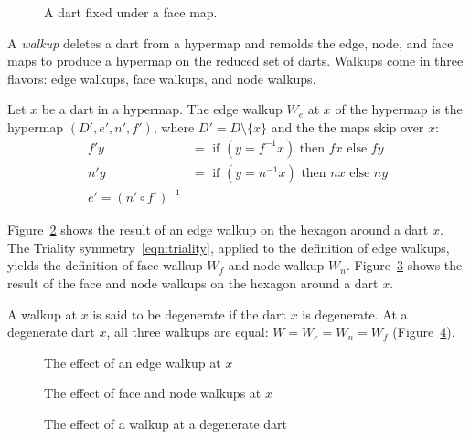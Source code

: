 \begin{figure}[htb]
  \centering
  \caption{A dart fixed under a face map.}
  \label{fig:dart-fix}
\end{figure}


A {\it walkup} deletes
a dart from a hypermap and remolds the edge, node, and face
maps to produce a hypermap on the reduced set of darts.  Walkups
come in three flavors: edge walkups, face walkups,
and node walkups.

\begin{definition}[walkup]
Let $x$ be a dart in a hypermap.  The edge walkup 
$W_e$ at $x$ of the hypermap is the hypermap
$(D',e',n',f')$, where $D' = D\setminus\{x\}$ and the
the maps skip over $x$:
    $$
    \begin{array}{lll}
    f' y &= \text{ if } (y = f^{-1} x) \text{ then } f x \text{ else
    } f y\\
    n' y &= \text{ if } (y = n^{-1} x) \text{ then } n x \text{ else
    } n y\\
    e' = (n'\circ f')^{-1}
    \end{array}
    $$
\end{definition}

Figure~\ref{fig:walk} shows
the result of an edge walkup on the hexagon around a dart $x$.
The Triality symmetry~\ref{eqn:triality}, applied to the definition
of edge walkups, yields the definition of
face walkup $W_f$ and node walkup $W_n$.  
Figure~\ref{fig:walkfn} shows the result of the face and node
walkups on the hexagon around a dart $x$.

A walkup at $x$ is said to be degenerate 
if the dart $x$ is degenerate.   
At a degenerate dart $x$, all three walkups
are equal: $W=W_e=W_n=W_f$ (Figure~\ref{fig:walkdeg}).

\begin{figure}[htb]
  \centering
  \caption{The effect of an edge walkup at $x$}
  \label{fig:walk}
\end{figure}

\begin{figure}[htb]
  \centering
  \caption{The effect of face and node walkups at $x$}
  \label{fig:walkfn}
\end{figure}

\begin{figure}[htb]
  \centering
  \caption{The effect of a walkup at a degenerate dart}
  \label{fig:walkdeg}
\end{figure}


